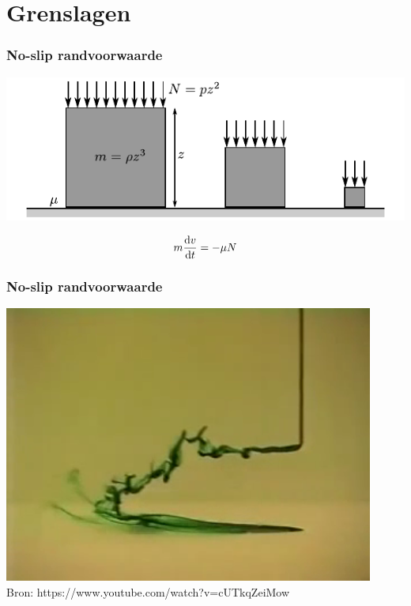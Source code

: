 \documentclass[t]{beamer}
\begin{document}
	\section{Grenslagen}
	\begin{frame}
		\frametitle{No-slip randvoorwaarde}
		\vspace{1cm}
		\center
		\includegraphics{fig/uitwendige_stroming/No-slip_statische_wrijving}
		
		\pause
		\begin{equation*}
			m \frac{\mathrm{d} v}{\mathrm{d} t} = -\mu N
		\end{equation*}
  	\end{frame}
	\begin{frame}
		\frametitle{No-slip randvoorwaarde}
		\center
		\href{run:fig/uitwendige_stroming/No-Slip_condition.mp4}{
			\includegraphics[height=0.8\textheight]{fig/uitwendige_stroming/No-Slip_condition.png}
		}\\
		\footnotesize{Bron: https://www.youtube.com/watch?v=cUTkqZeiMow}
  	\end{frame}
\end{document}
